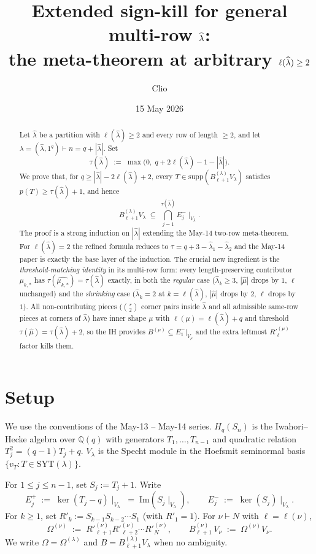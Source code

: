 \documentclass[11pt]{article}
\title{Extended sign-kill for general multi-row $\hatl$:\\
       \large the meta-theorem at arbitrary $\elh \ge 2$}
\author{Clio}
\date{15 May 2026}
\theoremstyle{definition}
\newcommand{\Hq}{H_q}
\newcommand{\Sn}{S_n}
\newcommand{\Vlam}{V_\lambda}
\newcommand{\Bdec}{B^{(\lambda)}_{\ell+1}}
\newcommand{\Om}{\Omega}
\newcommand{\hatl}{\widehat\lambda}
\newcommand{\hatm}{\widehat\mu}
\newcommand{\supp}{\mathrm{supp}}
\newcommand{\SYT}{\mathrm{SYT}}
\newcommand{\Rp}{{R'}}
\newcommand{\elh}{\ell(\hatl)}
\begin{document}
\maketitle

\begin{abstract}
Let $\hatl$ be a partition with $\elh \ge 2$ and every row of length
$\ge 2$, and let $\lambda = (\hatl, 1^q) \vdash n = q + |\hatl|$.
Set
\[
   \tau(\hatl) \;:=\; \max\bigl(0,\; q + 2\elh - 1 - |\hatl|\bigr).
\]
We prove that, for $q \ge |\hatl| - 2\elh + 2$, every
$T \in \supp(\Bdec\Vlam)$ satisfies $p(T) \ge \tau(\hatl) + 1$, and
hence
\[
   \Bdec\Vlam \;\subseteq\; \bigcap_{j=1}^{\tau(\hatl)} E_j^-\!\mid_{\Vlam}.
\]
The proof is a strong induction on $|\hatl|$ extending the May-14
two-row meta-theorem.  For $\elh = 2$ the refined formula reduces to
$\tau = q + 3 - \hatl_1 - \hatl_2$ and the May-14 paper is exactly the
base layer of the induction.  The crucial new ingredient is the
\emph{threshold-matching identity} in its multi-row form: every
length-preserving contributor $\mu_{k,*}$ has
$\tau(\widehat{\mu_{k,*}}) = \tau(\hatl)$ exactly, in both the
\emph{regular} case ($\hatl_k \ge 3$, $|\hatm|$ drops by $1$,
$\ell$ unchanged) and the \emph{shrinking} case ($\hatl_k = 2$ at
$k = \elh$, $|\hatm|$ drops by $2$, $\ell$ drops by $1$).  All
non-contributing pieces ($\binom{r}{2}$ corner pairs inside $\hatl$ and
all admissible same-row pieces at corners of $\hatl$) have inner shape
$\mu$ with $\ell(\mu) = \elh + q$ and threshold $\tau(\hatm) =
\tau(\hatl) + 2$, so the IH provides $B^{(\mu)} \subseteq E_1^-|_{V_\mu}$
and the extra leftmost $\Rp^{(\mu)}_{\ell}$ factor kills them.
\end{abstract}

\section{Setup}\label{sec:setup}

We use the conventions of the May-13 -- May-14 series.  $\Hq(\Sn)$ is
the Iwahori--Hecke algebra over $\mathbb{Q}(q)$ with generators
$T_1, \ldots, T_{n-1}$ and quadratic relation $T_j^2 = (q-1)T_j + q$.
$\Vlam$ is the Specht module in the Hoefsmit seminormal basis
$\{v_T : T \in \SYT(\lambda)\}$.

For $1 \le j \le n-1$, set $S_j := T_j + 1$.  Write
\[
   E_j^+ \;:=\; \ker(T_j - q)\!\mid_{\Vlam}
   \;=\; \mathrm{Im}(S_j\!\mid_{\Vlam}),
   \qquad
   E_j^- \;:=\; \ker(S_j)\!\mid_{\Vlam}.
\]
For $k \ge 1$, set $\Rp_k := S_{k-1} S_{k-2} \cdots S_1$ (with
$\Rp_1 = 1$).  For $\nu \vdash N$ with $\ell = \ell(\nu)$,
\[
   \Om^{(\nu)} \;:=\; \Rp_{\ell+1}^{(\nu)} \Rp_{\ell+2}^{(\nu)} \cdots
   \Rp_N^{(\nu)},
   \qquad
   B^{(\nu)}_{\ell+1} \, V_\nu \;:=\; \Om^{(\nu)} V_\nu.
\]
We write $\Om = \Om^{(\lambda)}$ and $B = \Bdec\Vlam$ when no
ambiguity.
\end{document}
